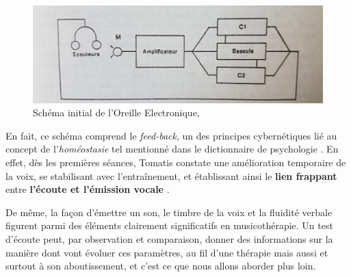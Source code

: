 \begin{figure}
	\centering
	\includegraphics[width=0.7\linewidth]{images/oreilleelectro.jpg}
	\caption[L'Oreille
          Electronique: schéma]{Schéma initial de l'Oreille
          Electronique,\autocite[p.~97] {tomatisoreilletvie}}
\label{oreilleelectro}
\end{figure}
En fait, ce schéma comprend le\textit{ feed-back}, un des principes
cybernétiques lié au concept de l'\textit{homéostasie} tel
mentionné dans le dictionnaire de
psychologie \autocite[298]{doronparot}.
En effet, dès les premières
séances, Tomatis constate une amélioration temporaire de la voix, se
stabilisant avec l'entraînement, et établissant ainsi le
\textbf{lien frappant} entre\textbf{ l'écoute et
  l'émission vocale} \autocite {tomatisoreilletvie}.

De même, la façon d'émettre un son, le timbre de la voix et la fluidité
verbale figurent parmi des
éléments clairement significatifs en musicothérapie.
Un test d'écoute peut, par observation et comparaison, donner des informations sur la manière dont vont évoluer ces paramètres, au fil d'une thérapie mais aussi et surtout à son aboutissement, et c'est ce que nous allons aborder plus loin.




